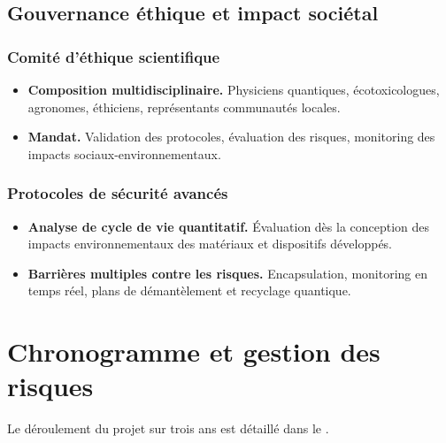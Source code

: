 \documentclass[12pt, a4paper]{article}
\begin{document}
\subsection{Gouvernance éthique et impact sociétal}

\subsubsection{Comité d'éthique scientifique}

\begin{itemize}
    \item \textbf{Composition multidisciplinaire.} Physiciens quantiques, écotoxicologues, agronomes, éthiciens, représentants communautés locales.
    
    \item \textbf{Mandat.} Validation des protocoles, évaluation des risques, monitoring des impacts sociaux-environnementaux.
\end{itemize}

\subsubsection{Protocoles de sécurité avancés}

\begin{itemize}
    \item \textbf{Analyse de cycle de vie quantitatif.} Évaluation dès la conception des impacts environnementaux des matériaux et dispositifs développés.
    
    \item \textbf{Barrières multiples contre les risques.} Encapsulation, monitoring en temps réel, plans de démantèlement et recyclage quantique.
\end{itemize}

\section{Chronogramme et gestion des risques}

Le déroulement du projet sur trois ans est détaillé dans le .
\end{document}
